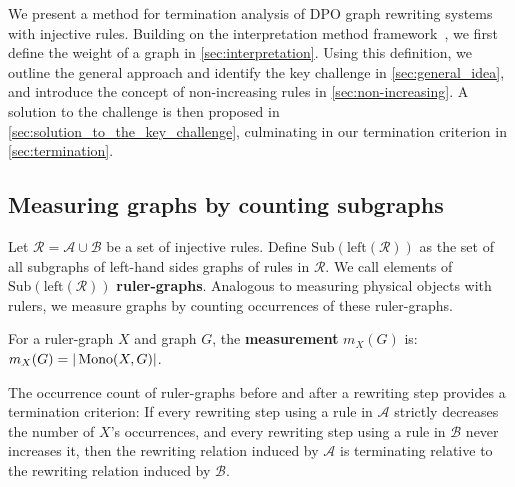 We present a method for termination analysis of DPO graph rewriting systems with injective rules.
Building on the interpretation method framework~\cite{nipkow1998term}, we first define the weight of a graph in \autoref{sec:interpretation}. 
Using this definition, we outline the general approach and identify the key challenge in \autoref{sec:general_idea}, and introduce the concept of non-increasing rules in \autoref{sec:non-increasing}. 
A solution to the challenge is then proposed in \autoref{sec:solution_to_the_key_challenge}, culminating in our termination criterion in \autoref{sec:termination}.

\subsection{Measuring graphs by counting subgraphs}
\label{sec:interpretation}
Let $\mathcal{R} = \mathcal{A} \cup \mathcal{B}$ be a set of injective rules.
Define $\mathrm{Sub}(\mathrm{left}(\mathcal{R}))$ as the set of all subgraphs of left-hand sides graphs of rules in $\mathcal{R}$.
We call elements of $\mathrm{Sub}(\mathrm{left}(\mathcal{R}))$ \textbf{ruler-graphs}. Analogous to measuring physical objects with rulers, we measure graphs by counting occurrences of these ruler-graphs.

\begin{definition}
    For a ruler-graph \( X \) and graph \( G \), the \textbf{measurement} \( m_X(G) \) is:
    \(
        m_X(G) = |\operatorname{Mono}(X, G)|
    \).
\end{definition} 
The occurrence count of ruler-graphs before and after a rewriting step provides a termination criterion: 
    If every rewriting step using a rule in $\mathcal{A}$ strictly decreases the number of $X$'s occurrences, and every rewriting step using a rule in $\mathcal{B}$ never increases it, then the rewriting relation induced by $\mathcal{A}$ is terminating relative to the rewriting relation induced by $\mathcal{B}$.
 
